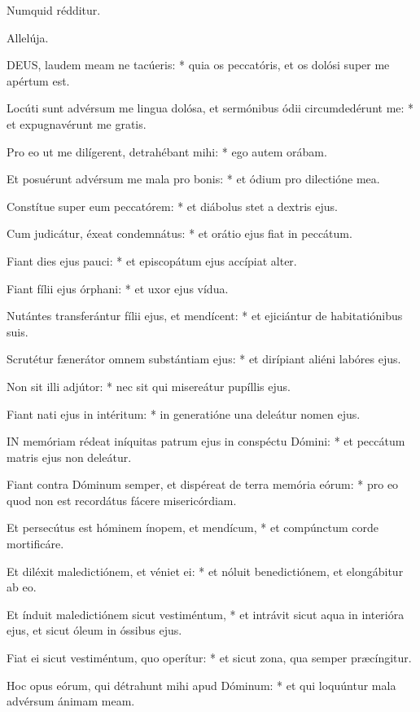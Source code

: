  Numquid rédditur.

  Allelúja.


\lettrine[lines=2]{D}{EUS}, laudem meam ne tacúeris: * quia os peccatóris, et os dolósi super me apértum est.

Locúti sunt advérsum me lingua dolósa, et sermónibus ódii circumdedérunt me: * et expugnavérunt me gratis.

Pro eo ut me dilígerent, detrahébant mihi: * ego autem orábam.

Et posuérunt advérsum me mala pro bonis: * et ódium pro dilectióne mea.

Constítue super eum peccatórem: * et diábolus stet a dextris ejus.

Cum judicátur, éxeat condemnátus: * et orátio ejus fiat in peccátum.

Fiant dies ejus pauci: * et episcopátum ejus accípiat alter.

Fiant fílii ejus órphani: * et uxor ejus vídua.

Nutántes transferántur fílii ejus, et mendícent: * et ejiciántur de habitatiónibus suis.

Scrutétur fænerátor omnem substántiam ejus: * et dirípiant aliéni labóres ejus.

Non sit illi adjútor: * nec sit qui misereátur pupíllis ejus.

Fiant nati ejus in intéritum: * in generatióne una deleátur nomen ejus.


\lettrine[lines=2]{I}{N} memóriam rédeat iníquitas patrum ejus in conspéctu Dómini: * et peccátum matris ejus non deleátur.

Fiant contra Dóminum semper, et dispéreat de terra memória eórum: * pro eo quod non est recordátus fácere misericórdiam.

Et persecútus est hóminem ínopem, et mendícum, * et compúnctum corde mortificáre.

Et diléxit maledictiónem, et véniet ei: * et nóluit benedictiónem, et elongábitur ab eo.

Et índuit maledictiónem sicut vestiméntum, * et intrávit sicut aqua in interióra ejus, et sicut óleum in óssibus ejus.

Fiat ei sicut vestiméntum, quo operítur: * et sicut zona, qua semper præcíngitur.

Hoc opus eórum, qui détrahunt mihi apud Dóminum: * et qui loquúntur mala advérsum ánimam meam.

